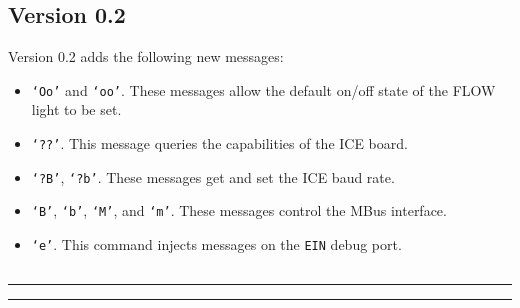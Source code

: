 \subsection{Version 0.2}
\label{protocol-0-2}

Version 0.2 adds the following new messages:
\begin{itemize}
  \item {\tt `Oo'} and {\tt `oo'}. These messages allow the default on/off state of
the FLOW light to be set.
  \item {\tt `??'}. This message queries the capabilities of the ICE board.
  \item {\tt `?B'}, {\tt `?b'}. These messages get and set the ICE baud rate.
  \item {\tt `B'}, {\tt `b'}, {\tt `M'}, and {\tt `m'}. These messages control
    the MBus interface.
  \item {\tt `e'}. This command injects messages on the {\tt EIN} debug port.
\end{itemize}

\setcounter{tocdepth}{4}
\etocsettocstyle
    {\subsection*{\contentsname}\hrule\medskip
        }
    {\nobreak\medskip\hrule\bigskip}

\localtableofcontents


